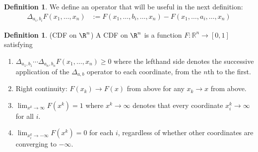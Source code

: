 \documentclass[12pt]{article}
\theoremstyle{plain}
\theoremstyle{definition}
\newtheorem{defn}[thm]{Definition}
\theoremstyle{remark}
\newcommand{\ra}{\rightarrow}
\newcommand{\Rn}{\mathbb{R}^n}
\begin{document}
\begin{defn}
We define an operator that will be useful in the next definition:
\begin{align*}
  \Delta_{a_i,b_i} F(x_1,\ldots,x_n)
  &:= F(x_1,\ldots,b_i,\ldots,x_n)
  - F(x_1,\ldots,a_i,\ldots,x_n)
\end{align*}
\end{defn}

\begin{defn}(CDF on $\R^n$)
\label{defn:F}
A CDF on $\R^n$ is a function $F:\Rn\ra[0,1]$ satisfying
\begin{enumerate}
  \item
    $\Delta_{a_1,b_1} \cdots
    \Delta_{a_n,b_n}
    F(x_1,\ldots,x_n) \geq 0$
    where the lefthand side denotes the successive application of the
    $\Delta_{a,b}$ operator to each coordinate, from the $n$th to the
    first.

  \item Right continuity: $F(x_k) \ra F(x)$ from above for any
    $x_k \ra x$ from above.

  \item $\lim_{x^k \ra \infty} F(x^k)=1$ where $x^k\ra \infty$ denotes
    that every coordinate $x^k_i \ra \infty$ for all $i$.

  \item $\lim_{x^k_i\ra-\infty} F(x^k) = 0$ for each $i$,
    regardless of whether other coordinates are converging to
    $-\infty$.
\end{enumerate}
\end{defn}
\end{document}
